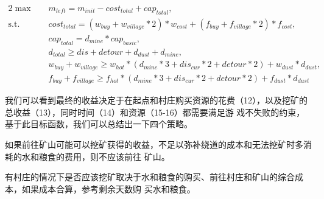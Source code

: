 \documentclass[bwprint]{cumcmthesis} %
\begin{document}
\begin{alignat}{2}
    \max \quad & m_{left} = m_{init} - cost_{total} + cap_{total}, \\
    \mbox{s.t.}\quad
    &cost_{total} = (w_{buy}+w_{village}*2)*w_{cost} + (f_{buy}+f_{village}*2)*f_{cost},  \\ 
    &cap_{total} = d_{mine}*cap_{basic} ,\\ %
    &d_{total} \geq dis + detour + d_{dust} + d_{mine}, \\ %
    &w_{buy}+w_{village} \geq w_{hot}*(d_{mine}*3+dis_{cur}*2+detour*2) + w_{dust}*d_{dust}, \\ %
    &f_{buy}+f_{village} \geq f_{hot}*(d_{mine}*3+dis_{cur}*2+detour*2) + f_{dust}*d_{dust} %
\end{alignat}

我们可以看到最终的收益决定于在起点和村庄购买资源的花费（12），以及挖矿的总收益（13），同时时间（14）和资源（15-16）都需要满足游
戏不失败的约束，基于此目标函数，我们可以总结出一下四个策略。


\begin{route}
    如果前往矿山可能可以挖矿获得的收益，不足以弥补绕道的成本和无法挖矿时多消耗的水和粮食的费用，则不应该前往
    矿山。
    \label{route:choose}
\end{route}

\begin{route}
    有村庄的情况下是否应该挖矿取决于水和粮食的购买、前往村庄和矿山的综合成本，如果成本合算，参考剩余天数购
    买水和粮食。
    \label{route:country}
\end{route}
\end{document}
